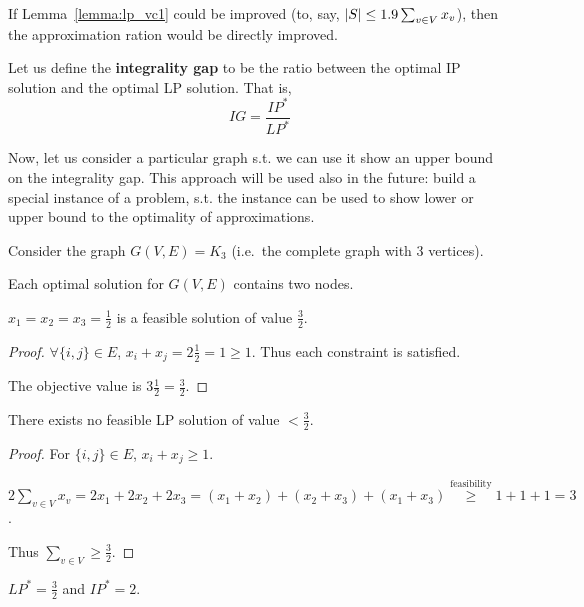     If Lemma~\ref{lemma:lp_vc1} could be improved (to, say, $\vert S \vert \leq 1.9 \sum_{v \in V} x_v$), then the approximation ration would be directly improved.

    Let us define the \textbf{integrality gap} to be the ratio between the optimal IP solution and the optimal LP solution. That is,
    \[ IG = \frac{IP^*}{LP^* } \]

    Now, let us consider a particular graph s.t. we can use it show an upper bound on the integrality gap.
    This approach will be used also in the future: build a special instance of a problem, s.t. the instance can be used to show lower or upper bound to the optimality of approximations.

    Consider the graph $G(V,E) = K_3$ (i.e.~the complete graph with $3$ vertices).

    \begin{lemma}
        Each optimal solution for $G(V,E)$ contains two nodes.
    \end{lemma}

    \begin{lemma}
        $x_1 = x_2 = x_3 = \frac{1}{2}$ is a feasible solution of value $\frac{3}{2}$.
    \end{lemma}

    \begin{proof}
        $\forall \{ i,j \} \in E$, $x_i + x_j = 2 \frac{1}{2} = 1 \geq 1$. Thus each constraint is satisfied.

        The objective value is $3 \frac{1}{2} = \frac{3}{2}$.
    \end{proof}

    \begin{lemma}
        There exists no feasible LP solution of value $< \frac{3}{2}$.
    \end{lemma}

    \begin{proof}
        For $\{ i,j \} \in E$, $x_i + x_j \geq 1$.

        $2 \sum_{v \in V} x_v = 2 x_1 + 2 x_2 + 2 x_3 = (x_1 + x_2) + (x_2 + x_3) + (x_1 + x_3) \overset{\text{feasibility}}{\geq} 1 + 1 + 1 = 3 $.

        Thus $\sum_{v \in V} \geq \frac{3}{2}$.
    \end{proof}

    \begin{corollary}
        $LP^* = \frac{3}{2}$ and $IP^* = 2$.
    \end{corollary}

